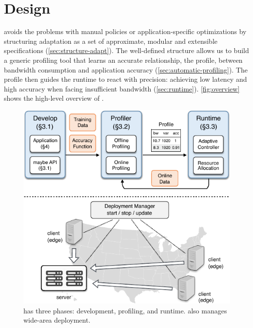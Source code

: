 \section{\sysname{} Design}
\label{sec:system}

\sysname{} avoids the problems with manual policies or application-specific
optimizations by structuring adaptation as a set of approximate, modular and
extensible specifications (\autoref{sec:structure-adapt}). The well-defined
structure allows us to build a generic profiling tool that learns an accurate
relationship, the profile, between bandwidth consumption and application
accuracy (\autoref{sec:automatic-profiling}). The profile then guides the
runtime to react with precision: achieving low latency and high accuracy when
facing insufficient bandwidth (\autoref{sec:runtime}). \autoref{fig:overview}
shows the high-level overview of \sysname{}.

\begin{figure}
  \centering
  \includegraphics[width=0.8\linewidth]{figures/system.pdf}
  \caption{\sysname{} has three phases: development, profiling, and runtime.
    \sysname{} also manages wide-area deployment.}
  \label{fig:overview}
  \vspace{-1em}
\end{figure}






